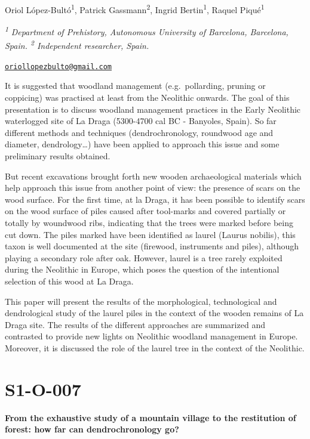 \documentclass[
]{book}
\begin{document}
Oriol López-Bultó\textsuperscript{1}, Patrick Gassmann\textsuperscript{2}, Ingrid Bertin\textsuperscript{1}, Raquel Piqué\textsuperscript{1}

\textsuperscript{\emph{1}} \emph{Department of Prehistory, Autonomous University of Barcelona, Barcelona, Spain. \textsuperscript{2} Independent researcher, Spain.}

\href{mailto:oriollopezbulto@gmail.com}{\nolinkurl{oriollopezbulto@gmail.com}}

It is suggested that woodland management (e.g.~pollarding, pruning or coppicing) was practised at least from the Neolithic onwards. The goal of this presentation is to discuss woodland management practices in the Early Neolithic waterlogged site of La Draga (5300-4700 cal BC - Banyoles, Spain). So far different methods and techniques (dendrochronology, roundwood age and diameter, dendrology\ldots) have been applied to approach this issue and some preliminary results obtained.

But recent excavations brought forth new wooden archaeological materials which help approach this issue from another point of view: the presence of scars on the wood surface. For the first time, at la Draga, it has been possible to identify scars on the wood surface of piles caused after tool-marks and covered partially or totally by woundwood ribs, indicating that the trees were marked before being cut down. The piles marked have been identified as laurel (Laurus nobilis), this taxon is well documented at the site (firewood, instruments and piles), although playing a secondary role after oak. However, laurel is a tree rarely exploited during the Neolithic in Europe, which poses the question of the intentional selection of this wood at La Draga.

This paper will present the results of the morphological, technological and dendrological study of the laurel piles in the context of the wooden remains of La Draga site. The results of the different approaches are summarized and contrasted to provide new lights on Neolithic woodland management in Europe. Moreover, it is discussed the role of the laurel tree in the context of the Neolithic.

\hypertarget{s1-o-007}{%
\section*{S1-O-007}\label{s1-o-007}}

\textbf{From the exhaustive study of a mountain village to the restitution of forest: how far can dendrochronology go?}
\end{document}
